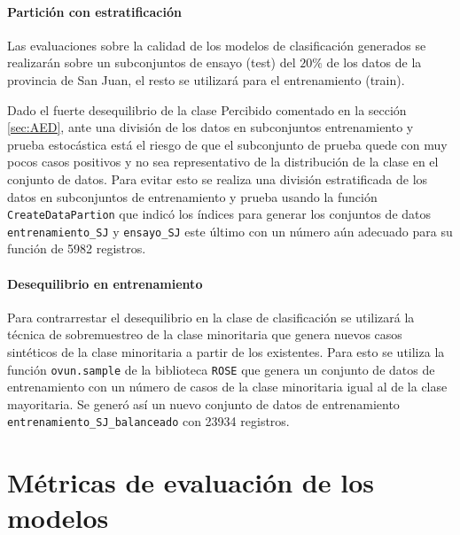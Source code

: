 \documentclass[a4paper]{report}
\begin{document}
\paragraph{Partición con estratificación}
Las evaluaciones sobre la calidad de los modelos de clasificación generados se realizarán sobre un subconjuntos de ensayo (test) del \(20 \%\) de los datos de la provincia de San Juan, el resto se utilizará para el entrenamiento (train).

Dado el fuerte desequilibrio de la clase Percibido comentado en la sección \ref{sec:AED}, ante una división de los datos en subconjuntos entrenamiento y prueba estocástica está el riesgo de que el subconjunto de prueba quede con muy pocos casos positivos y no sea representativo de la distribución de la clase en el conjunto de datos. 
Para evitar esto se realiza una división estratificada de los datos en subconjuntos de entrenamiento y prueba usando la función \lstinline[language = R]'CreateDataPartion' que indicó los índices para generar los conjuntos de datos \lstinline[language = R]'entrenamiento_SJ' y \lstinline[language = R]'ensayo_SJ' este último con un número aún adecuado para su función de \num{5982} registros.


\paragraph{Desequilibrio en entrenamiento}
Para contrarrestar el desequilibrio en la clase de clasificación se utilizará la técnica de sobremuestreo de la clase minoritaria que genera nuevos casos sintéticos de la clase minoritaria a partir de los existentes.
Para esto se utiliza la función \lstinline[language = R]'ovun.sample' de la biblioteca \lstinline[language = R]'ROSE' que genera un conjunto de datos de entrenamiento con un número de casos de la clase minoritaria igual al de la clase mayoritaria.
Se generó así un nuevo conjunto de datos de entrenamiento \lstinline[language = R]'entrenamiento_SJ_balanceado' con \num{23934} registros.









\section{Métricas de evaluación de los modelos}
\end{document}

